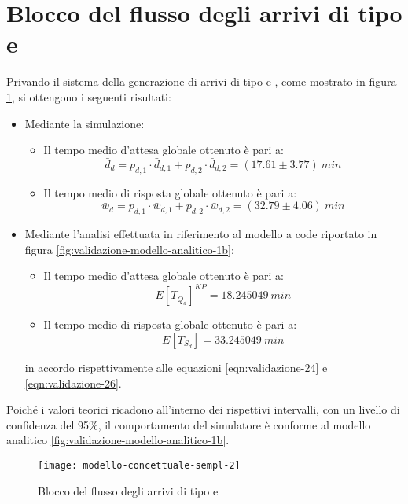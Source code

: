 \section{Blocco del flusso degli arrivi di tipo \uo{} e \pp{}}\label{sec:validazione-blocco-uo-pp}
Privando il sistema della generazione di arrivi di tipo \uo{} e \pp{}, come mostrato in figura \ref{fig:validazione-semplificazione-2}, si ottengono i seguenti risultati:
\begin{itemize}
\item Mediante la simulazione:
\begin{itemize}
\item Il tempo medio d'attesa globale ottenuto è pari a:
\begin{equation} 
\bar{d}_d = p_{d,1}\cdot \bar{d}_{d,1} + p_{d,2}\cdot \bar{d}_{d,2} = (17.61 \pm 3.77)\ min
\end{equation}
\item Il tempo medio di risposta globale ottenuto è pari a:
\begin{equation}
\bar{w}_d = p_{d,1}\cdot \bar{w}_{d,1} + p_{d,2}\cdot \bar{w}_{d,2} = (32.79 \pm 4.06)\ min
\end{equation}
\end{itemize}

\item Mediante l'analisi effettuata in riferimento al modello a code riportato in figura \ref{fig:validazione-modello-analitico-1b}:
\begin{itemize}
\item Il tempo medio d'attesa globale ottenuto è pari a:
\begin{equation}
E[T_{Q_d}]^{KP} = 18.245049\ min 
\end{equation}
\item Il tempo medio di risposta globale ottenuto è pari a:
\begin{equation}
E[T_{S_d}] = 33.245049\ min 
\end{equation}
\end{itemize}
in accordo rispettivamente alle equazioni \ref{eqn:validazione-24} e \ref{eqn:validazione-26}.
\end{itemize}

Poiché i valori teorici ricadono all'interno dei rispettivi intervalli, con un livello di confidenza del 95\%, il comportamento del simulatore è conforme al modello analitico \ref{fig:validazione-modello-analitico-1b}.

\begin{figure}[ht]
\centering
\texttt{[image: modello-concettuale-sempl-2]}
\caption{Blocco del flusso degli arrivi di tipo \uo{} e \pp{}}
\label{fig:validazione-semplificazione-2}
\end{figure}
